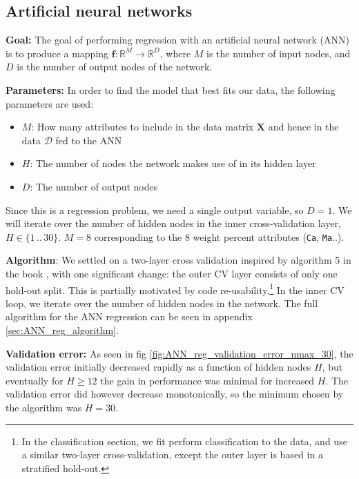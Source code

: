 \subsection{Artificial neural networks}

\textbf{Goal:} The goal of performing regression with an artificial neural network (ANN) is to produce a mapping $\bm{f}: \mathbb{R}^M \rightarrow \mathbb{R}^D$, where $M$ is the number of input nodes, and $D$ is the number of output nodes of the network. 

\textbf{Parameters:} In order to find the model that best fits our data, the following parameters are used:

\begin{itemize}
\item $M$: How many attributes to include in the data matrix $\bm{X}$ and hence in the data $\mathcal{D}$ fed to the ANN
\item $H$: The number of  nodes the network makes use of in its hidden layer
\item $D$: The number of output nodes
\end{itemize}

Since this is a regression problem, we need a single output variable, so $D = 1$. We will iterate over the number of hidden nodes in the inner cross-validation layer, $H \in \{1\, .. \, 30\}$. $M = 8$ corresponding to the 8 weight percent attributes (\texttt{Ca}, \texttt{Ma}..).

\textbf{Algorithm}: We settled on a two-layer cross validation inspired by algorithm 5 in the book \cite{coursenotes}, with one significant change: the outer CV layer consists of only one hold-out split. This is partially motivated by code re-usability.\footnote{In the classification section, we fit perform classification to the data, and use a similar two-layer cross-validation, except the outer layer is based in a stratified hold-out.} In the inner CV loop, we iterate over the number of hidden nodes in the network. The full algorithm for the ANN regression can be seen in appendix \ref{sec:ANN_reg_algorithm}.


\textbf{Validation error:} 
As seen in fig \ref{fig:ANN_reg_validation_error_nmax_30},  the validation error initially decreased rapidly as a function of hidden nodes $H$, but eventually for $H \geq 12$ the gain in performance was minimal for increased $H$. The validation error did however decrease monotonically, so the minimum chosen by the algorithm was $H=30$. 


